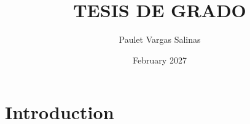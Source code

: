 \documentclass{article}
\title{TESIS DE GRADO}
\author{Paulet Vargas Salinas}
\date{February 2027}
\begin{document}
\maketitle

\section{Introduction}
\end{document}
